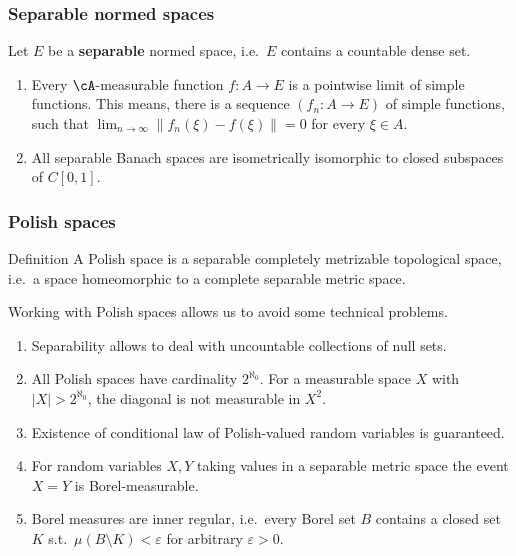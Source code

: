 \begin{frame}
    \frametitle{Separable normed spaces}
    
    Let $E$ be a \textbf{separable} normed space, i.e.\ $E$ contains a
    countable dense set. 

    \begin{enumerate}
        \item Every $\cA$-measurable function $f: A\to E$ is a pointwise limit of
            simple functions.  This means, there is a sequence $(f_n:A\to E)$
            of simple functions, such that $\lim_{n\to \infty} \|
            f_n(\xi)-f(\xi) \| =0$ for every $\xi\in A$. 
        \item All separable Banach spaces are isometrically isomorphic to
            closed subspaces of $C[0, 1]$. 
    \end{enumerate}
\end{frame}


\begin{frame}
    \frametitle{Polish spaces}
    
    \begin{block}{Definition}
        A Polish space is a separable completely metrizable topological space,
        i.e.\ a space homeomorphic to a complete separable metric space. 
    \end{block}

    Working with Polish spaces allows us to avoid some technical problems.
    \begin{enumerate}
        \item Separability allows to deal with uncountable collections
            of null sets. 
        \item All Polish spaces have cardinality $2^{\aleph_0}$. For a
            measurable space $X$ with $| X | > 2^{\aleph_0}$, the diagonal
            is not measurable in $X^2$. 
        \item Existence of conditional law of Polish-valued random variables is
            guaranteed. 
        \item For random variables $X,Y$ taking values in a separable
            metric space the event $X=Y$ is Borel-measurable.
        \item Borel measures are inner regular, i.e.\ every Borel set $B$ 
            contains a closed set $K$ s.t.\ $\mu (B \setminus K) < \varepsilon$
            for arbitrary $\varepsilon>0$.
    \end{enumerate}
\end{frame}


